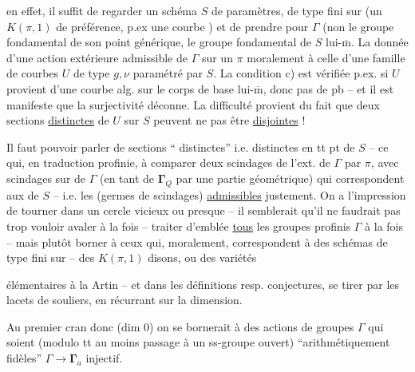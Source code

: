 en effet, il suffit de regarder un schéma $S$ de paramètres, de type fini sur  (un $K(\pi,1)$ de préférence, p.ex une courbe ) et de prendre pour $\Gamma$ (non le groupe fondamental de son point générique,   le groupe fondamental de $S$ lui-$\overline{\mathrm m}$. La donnée d'une action extérieure admissible de $\Gamma$ sur un $\pi$  moralement à celle d'une famille de courbes $U$ de type $g,\nu$ paramétré par $S$. La condition c) est vérifiée p.ex. si $U$ provient d'une courbe alg. sur le corps de base lui-$\overline{\mathrm m}$, donc pas de pb -- et il est manifeste que la surjectivité déconne. La difficulté provient du fait que deux sections \uline{distinctes} de $U$ sur $S$ peuvent ne pas être \uline{disjointes} !



Il faut pouvoir parler de sections `` distinctes'' i.e. distinctes en tt pt de $S$ -- ce qui, en traduction profinie,  à comparer deux scindages de l'ext. de $\Gamma$ par $\pi$, avec   scindages sur  de $\Gamma$ (en tant  de $\boldsymbol{\Gamma}_Q$ par une partie géométrique) qui correspondent aux  de $S$ -- i.e. les (germes de scindages) \uline{admissibles} justement. On a l'impression de tourner dans un cercle vicieux ou presque -- il semblerait qu'il ne faudrait pas trop vouloir avaler à la fois -- traiter d'emblée \uline{tous} les groupes profinis $\Gamma$ à la fois -- mais plutôt  borner  à ceux qui, moralement, correspondent à des  schémas de type fini sur  -- des $K(\pi,1)$ disons, ou  des variétés


élémentaires à la Artin -- et dans les définitions resp. conjectures, se tirer par les lacets de souliers, en récurrant sur la dimension.

Au premier cran donc (dim $0$) on se bornerait à des actions de groupes $\Gamma$ qui soient (modulo tt au moins passage à un ss-groupe ouvert) ``arithmétiquement fidèles''  $\Gamma\to\boldsymbol{\Gamma}_a$ injectif.


